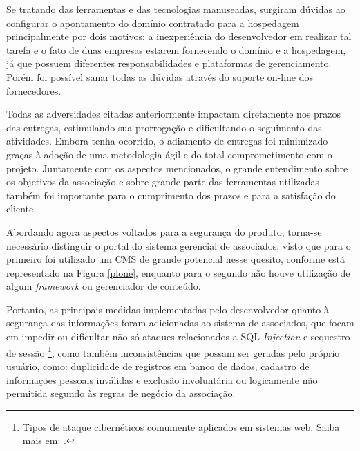 Se tratando das ferramentas e das tecnologias manuseadas, surgiram dúvidas ao configurar o apontamento do domínio contratado para a hospedagem principalmente por dois motivos: a inexperiência do desenvolvedor em realizar tal tarefa e o fato de duas empresas estarem fornecendo o domínio e a hospedagem, já que possuem diferentes responsabilidades e plataformas de gerenciamento. Porém foi possível sanar todas as dúvidas através do suporte on-line dos fornecedores.

Todas as adversidades citadas anteriormente impactam diretamente nos prazos das entregas, estimulando sua prorrogação e dificultando o seguimento das atividades. Embora tenha ocorrido, o adiamento de entregas foi minimizado graças à adoção de uma metodologia ágil e do total comprometimento com o projeto. Juntamente com os aspectos mencionados, o grande entendimento sobre os objetivos da associação e sobre grande parte das ferramentas utilizadas também foi importante para o cumprimento dos prazos e para a satisfação do cliente.

Abordando agora aspectos voltados para a segurança do produto, torna-se necessário distinguir o portal do sistema gerencial de associados, visto que para o primeiro foi utilizado um CMS de grande potencial nesse quesito, conforme está representado na Figura \ref{plone}, enquanto para o segundo não houve utilização de algum \textit{framework} ou gerenciador de conteúdo. 

Portanto, as principais medidas implementadas pelo desenvolvedor quanto à segurança das informações foram adicionadas ao sistema de associados, que focam em impedir ou dificultar não só ataques relacionados a SQL \textit{Injection} e sequestro de sessão \footnote{Tipos de ataque cibernéticos comumente aplicados em sistemas web. Saiba mais em: .}, como também inconsistências que possam ser geradas pelo próprio usuário, como: duplicidade de registros em banco de dados, cadastro de informações pessoais inválidas e exclusão involuntária ou logicamente não permitida segundo às regras de negócio da associação.

